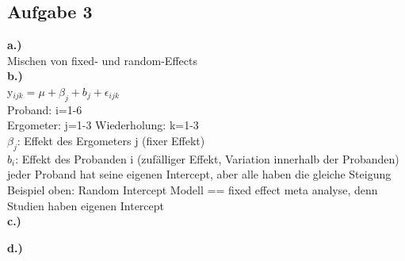 \documentclass[13pt,a4paper]{article}
\begin{document}
\subsection{Aufgabe 3}
\textbf{a.)}\\
Mischen von fixed- und random-Effects\\
\textbf{b.)}\\
y$_{ijk}=\mu+\beta_{j}+b_{j}+\epsilon_{ijk}$\\
Proband: i=1-6\\
Ergometer: j=1-3
Wiederholung: k=1-3\\
$\beta_j$: Effekt des Ergometers j (fixer Effekt)\\
$b_{i}$: Effekt des Probanden i (zufälliger Effekt, Variation innerhalb der Probanden)\\
jeder Proband hat seine eigenen Intercept, aber alle haben die gleiche Steigung\\
Beispiel oben: Random Intercept Modell == fixed effect meta analyse, denn Studien haben eigenen Intercept\\

\textbf{c.)}

\textbf{d.)}
\end{document}
